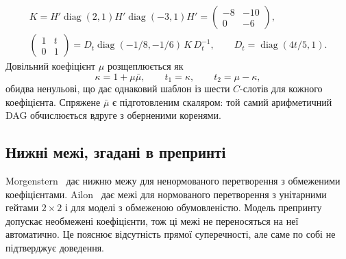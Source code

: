 \documentclass[11pt]{article}
\theoremstyle{plain}
\DeclareMathOperator{\diag}{diag}
\begin{document}
\begin{itemize}
\begin{equation}
\begin{gathered}
K=H'\diag(2,1)H'\diag(-3,1)H'=\begin{pmatrix}-8&-10\\0&-6\end{pmatrix},\\
\begin{pmatrix}1&t\\0&1\end{pmatrix}=D_t\diag(-1/8,-1/6)\,K\,D_t^{-1},\qquad D_t=\diag(4t/5,1).
\end{gathered}
\end{equation}
Довільний коефіцієнт $\mu$ розщеплюється як
\begin{equation}\label{eq:split}
\kappa=1+\mu\bar\mu,\qquad t_1=\kappa,\qquad t_2=\mu-\kappa,
\end{equation}
обидва ненульові, що дає однаковий шаблон із шести $C$-слотів для кожного коефіцієнта. Спряжене $\bar\mu$ є підготовленим скаляром: той самий арифметичний DAG обчислюється вдруге з оберненими коренями.
\end{itemize}

\subsection{Нижні межі, згадані в препринті}\label{sec:lower-bounds}
Morgenstern~\citep{morgenstern1973} дає нижню межу для ненормованого перетворення з обмеженими коефіцієнтами. Ailon~\citep{ailon2013,ailon2014} дає межі для нормованого перетворення з унітарними гейтами $2\times2$ і для моделі з обмеженою обумовленістю. Модель препринту допускає необмежені коефіцієнти, тож ці межі не переносяться на неї автоматично. Це пояснює відсутність прямої суперечності, але саме по собі не підтверджує доведення.
\end{document}
